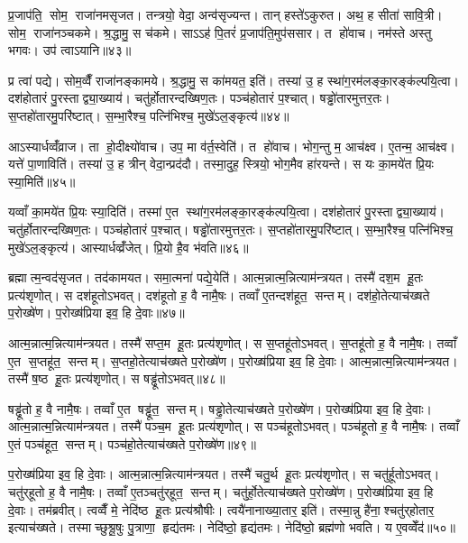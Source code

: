 प्र॒जाप॑ति॒ सोम॒ राजा॑नमसृजत। तन्त्रयो॒ वेदा॒ अन्व॑सृज्यन्त। तान् हस्ते॑ऽकुरुत। अथ॒ ह सीता॑ सावि॒त्री। सोम॒ राजा॑नञ्चकमे। श्र॒द्धामु॒ स च॑कमे। साऽऽह॑ पि॒तरं॑ प्र॒जाप॑ति॒मुप॑ससार। त हो॑वाच। नम॑स्ते अस्तु भगवः। उप॑ त्वाऽयानि॥४३॥

प्र त्वा॑ पद्ये। सोम॒व्वैँ राजा॑नङ्कामये। श्र॒द्धामु॒ स का॑मयत॒ इति॑। तस्या॑ उ॒ ह स्था॑ग॒रम॑लङ्का॒रङ्क॑ल्पयि॒त्वा। दश॑होतारं पु॒रस्ताद्व्या॒ख्याय॑। चतु॑र्\mbox{}होतारन्दख्षिण॒तः। पञ्च॑होतारं प॒श्चात्। षड्ढो॑तारमुत्तर॒तः। स॒प्तहो॑तारमु॒परि॑ष्टात्। स॒म्भा॒रैश्च॒ पत्नि॑भिश्च॒ मुखे॑ऽल॒ङ्कृत्य॑॥४४॥

आऽस्यार्धव्वँ॑व्राज। ता हो॒दीक्ष्यो॑वाच। उप॒ मा व॑र्त॒स्वेति॑। त हो॑वाच। भोग॒न्तु म॒ आच॑क्ष्व। ए॒तन्म॒ आच॑क्ष्व। यत्ते॑ पा॒णाविति॑। तस्या॑ उ॒ ह त्रीन् वेदा॒न्प्रद॑दौ। तस्मा॒दुह॒ स्त्रियो॒ भोग॒मैव हा॑रयन्ते। स यः का॒मये॑त प्रि॒यः स्या॒मिति॑॥४५॥

यव्वाँ का॒मये॑त प्रि॒यः स्या॒दिति॑। तस्मा॑ ए॒त स्था॑ग॒रम॑लङ्का॒रङ्क॑ल्पयि॒त्वा। दश॑होतारं पु॒रस्ताद्व्या॒ख्याय॑। चतु॑र्\mbox{}होतारन्दख्षिण॒तः। पञ्च॑होतारं प॒श्चात्। षड्ढो॑तारमुत्तर॒तः। स॒प्तहो॑तारमु॒परि॑ष्टात्। स॒म्भा॒रैश्च॒ पत्नि॑भिश्च॒ मुखे॑ऽल॒ङ्कृत्य॑। आस्यार्धव्व्रँ॑जेत्। प्रि॒यो है॒व भ॑वति॥४६॥\anuvakamend[अ॒या॒न्य॒ल॒ङ्कृत्य॑ स्या॒मिति॑ भवति]

ब्रह्मात्म॒न्वद॑सृजत। तद॑कामयत। समा॒त्मना॑ पद्ये॒येति॑। आत्म॒न्नात्म॒न्नित्याम॑न्त्रयत। तस्मै॑ दश॒म हू॒तः प्रत्य॑शृणोत्। स दश॑हूतोऽभवत्। दश॑हूतो ह॒ वै नामै॒षः। तव्वाँ ए॒तन्दश॑हूत॒ सन्तम्। दश॑हो॒तेत्याच॑ख्षते प॒रोख्षे॑ण। प॒रोख्ष॑प्रिया इव॒ हि दे॒वाः॥४७॥

आत्म॒न्नात्म॒न्नित्याम॑न्त्रयत। तस्मै॑ सप्त॒म हू॒तः प्रत्य॑शृणोत्। स स॒प्तहू॑तोऽभवत्। स॒प्तहू॑तो ह॒ वै नामै॒षः। तव्वाँ ए॒त स॒प्तहू॑त॒ सन्तम्। स॒प्तहो॒तेत्याच॑ख्षते प॒रोख्षे॑ण। प॒रोख्ष॑प्रिया इव॒ हि दे॒वाः। आत्म॒न्नात्म॒न्नित्याम॑न्त्रयत। तस्मै॑ ष॒ष्ठ हू॒तः प्रत्य॑शृणोत्। स षड्ढू॑तोऽभवत्॥४८॥

षड्ढू॑तो ह॒ वै नामै॒षः। तव्वाँ ए॒त षड्ढू॑त॒ सन्तम्। षड्ढो॒तेत्याच॑ख्षते प॒रोख्षे॑ण। प॒रोख्ष॑प्रिया इव॒ हि दे॒वाः। आत्म॒न्नात्म॒न्नित्याम॑न्त्रयत। तस्मै॑ पञ्च॒म हू॒तः प्रत्य॑शृणोत्। स पञ्च॑हूतोऽभवत्। पञ्च॑हूतो ह॒ वै नामै॒षः। तव्वाँ ए॒तं पञ्च॑हूत॒ सन्तम्। पञ्च॑हो॒तेत्याच॑ख्षते प॒रोख्षे॑ण॥४९॥

प॒रोख्ष॑प्रिया इव॒ हि दे॒वाः। आत्म॒न्नात्म॒न्नित्याम॑न्त्रयत। तस्मै॑ चतु॒र्थ हू॒तः प्रत्य॑शृणोत्। स चतु॑र्\mbox{}हूतोऽभवत्। चतु॑र्‌हूतो ह॒ वै नामै॒षः। तव्वाँ ए॒तञ्चतु॑र्‌हूत॒ सन्तम्। चतु॑र्हो॒तेत्याच॑ख्षते प॒रोख्षे॑ण। प॒रोख्ष॑प्रिया इव॒ हि दे॒वाः। तम॑ब्रवीत्। त्वव्वैँ मे॒ नेदि॑ष्ठ हू॒तः प्रत्य॑श्रौषीः। त्वयै॑नानाख्या॒तार॒ इति॑। तस्मा॒न्नु है॑ना॒श्चतु॑र्‌होतार॒ इत्याच॑ख्षते। तस्माच्छुश्रू॒षुः पु॒त्राणा॒ हृद्य॑तमः। नेदि॑ष्ठो॒ हृद्य॑तमः। नेदि॑ष्ठो॒ ब्रह्म॑णो भवति। य ए॒वव्वेँद॑॥५०॥

